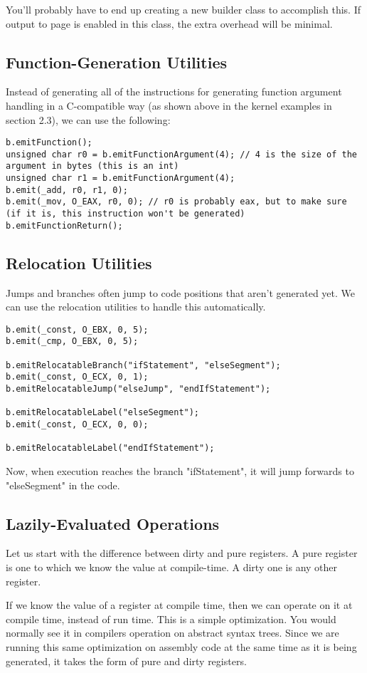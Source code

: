 \documentclass[10pt,a4paper]{article}
\begin{document}
You'll probably have to end up creating a new builder class to accomplish this. If output to page is enabled in this class, the extra overhead will be minimal. 

\subsection{Function-Generation Utilities}
Instead of generating all of the instructions for generating function argument handling in a C-compatible way (as shown above in the kernel examples in section 2.3), we can use the following:
\begin{verbatim}
b.emitFunction();
unsigned char r0 = b.emitFunctionArgument(4); // 4 is the size of the argument in bytes (this is an int)
unsigned char r1 = b.emitFunctionArgument(4);
b.emit(_add, r0, r1, 0);
b.emit(_mov, O_EAX, r0, 0); // r0 is probably eax, but to make sure (if it is, this instruction won't be generated)
b.emitFunctionReturn();
\end{verbatim}

\subsection{Relocation Utilities}
Jumps and branches often jump to code positions that aren't generated yet. We can use the relocation utilities to handle this automatically.
\begin{verbatim}
b.emit(_const, O_EBX, 0, 5);
b.emit(_cmp, O_EBX, 0, 5);

b.emitRelocatableBranch("ifStatement", "elseSegment");
b.emit(_const, O_ECX, 0, 1);
b.emitRelocatableJump("elseJump", "endIfStatement");

b.emitRelocatableLabel("elseSegment");
b.emit(_const, O_ECX, 0, 0);

b.emitRelocatableLabel("endIfStatement");
\end{verbatim}

Now, when execution reaches the branch "ifStatement", it will jump forwards to "elseSegment" in the code. 

\subsection{Lazily-Evaluated Operations}
Let us start with the difference between dirty and pure registers. A pure register is one to which we know the value at compile-time. A dirty one is any other register. 

If we know the value of a register at compile time, then we can operate on it at compile time, instead of run time. This is a simple optimization. You would normally see it in compilers operation on abstract syntax trees. Since we are running this same optimization on assembly code at the same time as it is being generated, it takes the form of pure and dirty registers.
\end{document}
